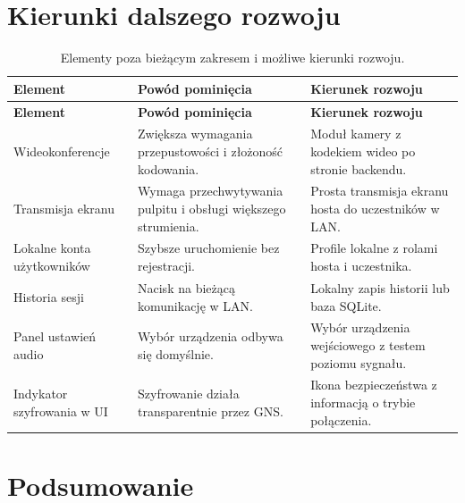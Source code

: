 \section{Kierunki dalszego rozwoju}
\label{sec:dalsza_rozbudowa_ui}

\begingroup
\small
\setlength{\LTpre}{6pt}
\setlength{\LTpost}{8pt}
\setlength{\tabcolsep}{3pt}
\renewcommand{\arraystretch}{1.2}
\begin{longtable}{|p{}|p{}|p{}|}
	\caption{Elementy poza bieżącym zakresem i możliwe kierunki rozwoju.}
	\label{tab:ui_dalszy_rozwoj}\\
	\hline
	\textbf{Element} & \textbf{Powód pominięcia} & \textbf{Kierunek rozwoju} \\
	\hline
	\endfirsthead
	\hline
	\textbf{Element} & \textbf{Powód pominięcia} & \textbf{Kierunek rozwoju} \\
	\hline
	\endhead
	Wideokonferencje & Zwiększa wymagania przepustowości i złożoność kodowania. &
	Moduł kamery z kodekiem wideo po stronie backendu. \\
	\hline
	Transmisja ekranu & Wymaga przechwytywania pulpitu i obsługi większego strumienia. &
	Prosta transmisja ekranu hosta do uczestników w LAN. \\
	\hline
	Lokalne konta użytkowników & Szybsze uruchomienie bez rejestracji. &
	Profile lokalne z rolami hosta i uczestnika. \\
	\hline
	Historia sesji & Nacisk na bieżącą komunikację w LAN. &
	Lokalny zapis historii lub baza SQLite. \\
	\hline
	Panel ustawień audio & Wybór urządzenia odbywa się domyślnie. &
	Wybór urządzenia wejściowego z testem poziomu sygnału. \\
	\hline
	Indykator szyfrowania w UI & Szyfrowanie działa transparentnie przez GNS. &
	Ikona bezpieczeństwa z informacją o trybie połączenia. \\
	\hline
\end{longtable}
\endgroup

\section{Podsumowanie}
\label{sec:podsumowanie_ui}

